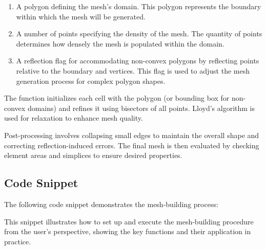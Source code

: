 \begin{enumerate}
    \item A polygon defining the mesh's domain. This polygon represents the boundary within which the mesh will be generated.
    \item A number of points specifying the density of the mesh. The quantity of points determines how densely the mesh is populated within the domain.
    \item A reflection flag for accommodating non-convex polygons by reflecting points relative to the boundary and vertices. This flag is used to adjust the mesh generation process for complex polygon shapes.
\end{enumerate}

The function initializes each cell with the polygon (or bounding box for non-convex domains) and refines it using bisectors of all points. Lloyd's algorithm is used for relaxation to enhance mesh quality.

Post-processing involves collapsing small edges to maintain the overall shape and correcting reflection-induced errors. The final mesh is then evaluated by checking element areas and simplices to ensure desired properties.

\newpage
\subsection{Code Snippet}

The following code snippet demonstrates the mesh-building process:



This snippet illustrates how to set up and execute the mesh-building procedure from the user's perspective, showing the key functions and their application in practice.